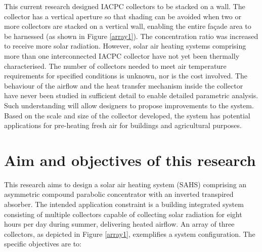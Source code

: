 
This current research designed IACPC collectors to be stacked on a wall. The collector has a vertical aperture so that shading can be avoided when two or more collectors are stacked on a vertical wall, enabling the entire façade area to be harnessed (as shown in Figure \ref{array1}). The concentration ratio was increased to receive more solar radiation. However, solar air heating systems comprising more than one interconnected IACPC collector have not yet been thermally characterised. The number of collectors needed to meet air temperature requirements for specified conditions is unknown, nor is the cost involved. The behaviour of the airflow and the heat transfer mechanism inside the collector have never been studied in sufficient detail to enable detailed parametric analysis. Such understanding will allow designers to propose improvements to the system. Based on the scale and size of the collector developed, the system has potential applications for pre-heating fresh air for buildings and agricultural purposes.



\section{Aim and objectives of this research}
This research aims to design a solar air heating system (SAHS) comprising  an asymmetric compound parabolic concentrator with an inverted transpired absorber. The intended application constraint is a building integrated system consisting of multiple collectors capable of collecting solar radiation for eight hours per day during summer, delivering heated airflow. An array of three collectors, as depicted in Figure \ref{array1}, exemplifies a system configuration. The specific objectives are to:

